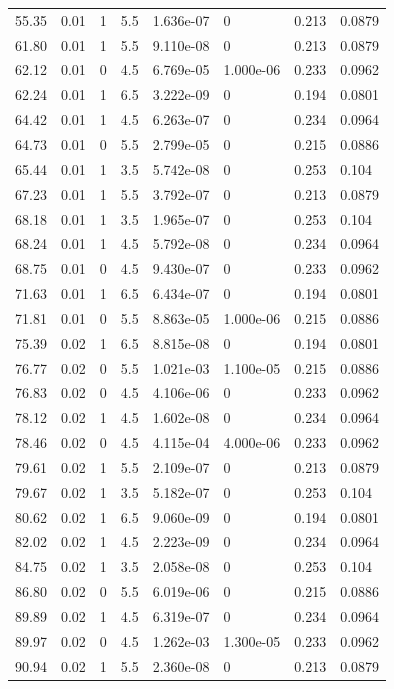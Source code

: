 \documentclass[preview]{standalone}
\begin{document}
{{{\begin{tabular}{L{1.2cm}C{1.2cm} C{0.3cm}C{0.5cm} C{1.4cm}C{1.4cm} C{1.4cm}C{1.4cm}}
  55.35  &  0.01  & 1     & 5.5 &  1.636e-07  & 0  & 0.213 &  0.0879   \\ 
  61.80  &  0.01  & 1     & 5.5 &  9.110e-08  & 0  & 0.213 &  0.0879   \\ 
  62.12  &  0.01  & 0     & 4.5 &  6.769e-05  & 1.000e-06  & 0.233 &  0.0962   \\ 
  62.24  &  0.01  & 1     & 6.5 &  3.222e-09  & 0  & 0.194 &  0.0801   \\ 
  64.42  &  0.01  & 1     & 4.5 &  6.263e-07  & 0  & 0.234 &  0.0964   \\ 
  64.73  &  0.01  & 0     & 5.5 &  2.799e-05  & 0  & 0.215 &  0.0886   \\ 
  65.44  &  0.01  & 1     & 3.5 &  5.742e-08  & 0  & 0.253 &  0.104   \\ 
  67.23  &  0.01  & 1     & 5.5 &  3.792e-07  & 0  & 0.213 &  0.0879   \\ 
  68.18  &  0.01  & 1     & 3.5 &  1.965e-07  & 0  & 0.253 &  0.104   \\ 
  68.24  &  0.01  & 1     & 4.5 &  5.792e-08  & 0  & 0.234 &  0.0964   \\ 
  68.75  &  0.01  & 0     & 4.5 &  9.430e-07  & 0  & 0.233 &  0.0962   \\ 
  71.63  &  0.01  & 1     & 6.5 &  6.434e-07  & 0  & 0.194 &  0.0801   \\ 
  71.81  &  0.01  & 0     & 5.5 &  8.863e-05  & 1.000e-06  & 0.215 &  0.0886   \\ 
  75.39  &  0.02  & 1     & 6.5 &  8.815e-08  & 0  & 0.194 &  0.0801   \\ 
  76.77  &  0.02  & 0     & 5.5 &  1.021e-03  & 1.100e-05  & 0.215 &  0.0886   \\ 
  76.83  &  0.02  & 0     & 4.5 &  4.106e-06  & 0  & 0.233 &  0.0962   \\ 
  78.12  &  0.02  & 1     & 4.5 &  1.602e-08  & 0  & 0.234 &  0.0964   \\ 
  78.46  &  0.02  & 0     & 4.5 &  4.115e-04  & 4.000e-06  & 0.233 &  0.0962   \\ 
  79.61  &  0.02  & 1     & 5.5 &  2.109e-07  & 0  & 0.213 &  0.0879   \\ 
  79.67  &  0.02  & 1     & 3.5 &  5.182e-07  & 0  & 0.253 &  0.104   \\ 
  80.62  &  0.02  & 1     & 6.5 &  9.060e-09  & 0  & 0.194 &  0.0801   \\ 
  82.02  &  0.02  & 1     & 4.5 &  2.223e-09  & 0  & 0.234 &  0.0964   \\ 
  84.75  &  0.02  & 1     & 3.5 &  2.058e-08  & 0  & 0.253 &  0.104   \\ 
  86.80  &  0.02  & 0     & 5.5 &  6.019e-06  & 0  & 0.215 &  0.0886   \\ 
  89.89  &  0.02  & 1     & 4.5 &  6.319e-07  & 0  & 0.234 &  0.0964   \\ 
  89.97  &  0.02  & 0     & 4.5 &  1.262e-03  & 1.300e-05  & 0.233 &  0.0962   \\ 
  90.94  &  0.02  & 1     & 5.5 &  2.360e-08  & 0  & 0.213 &  0.0879   \\ 
\hline 
\end{tabular} 

}}}
\end{document}
